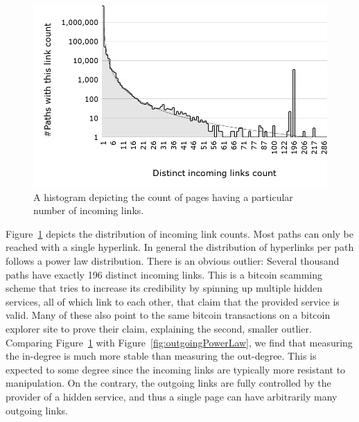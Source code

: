 \documentclass[USenglish,oneside,twocolumn]{article}
\begin{document}
\begin{figure}[t]
\includegraphics[width=\linewidth]{images/DistinctIncomingLinksCount.png}
\caption{A histogram depicting the count of pages having a particular
             number of incoming links.}
\label{fig:powerLawAbnormality}
\end{figure}

Figure~\ref{fig:powerLawAbnormality} depicts the distribution of incoming link counts. Most paths can only be reached with a single hyperlink. In general the distribution of hyperlinks per path follows a power law distribution. There is an obvious outlier: Several thousand paths have exactly 196 distinct incoming links. This is a bitcoin scamming scheme that tries to increase its credibility by spinning up multiple hidden services, all of which link to each other, that claim that the provided service is valid. Many of these also point to the same bitcoin transactions on a bitcoin explorer site to prove their claim, explaining the second, smaller outlier.
Comparing Figure~\ref{fig:powerLawAbnormality} with Figure~\ref{fig:outgoingPowerLaw}, we find that measuring the in-degree is much more stable than measuring the out-degree. This is expected to some degree since the incoming links are typically more resistant to manipulation. On the contrary, the outgoing links are fully controlled by the provider of a hidden service, and thus a single page can have arbitrarily many outgoing links.
\end{document}
